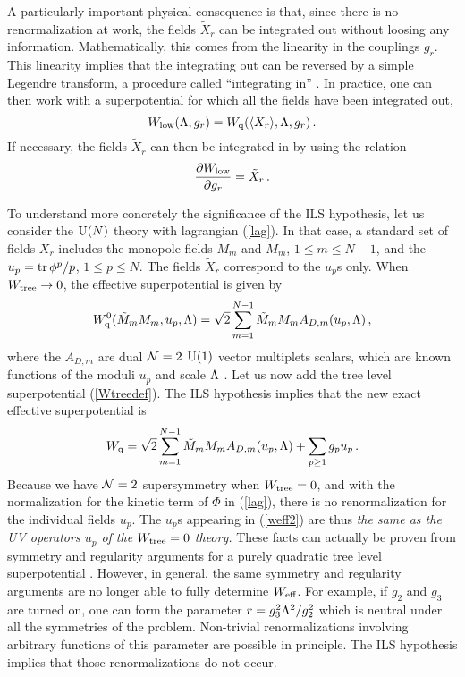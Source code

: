 \documentclass[a4paper,12pt]{article}
\def\tr{\mathop{\rm tr}\nolimits}
\def\uN{{\rm U}(N)}
\def\wl{W_{\rm low}}\def\wu{W_{\rm up}}\def\wq{W_{\rm q}}
\def\wt{W_{\rm tree}}\def\weff{W_{\rm eff}}\def\ww{{\cal W}}
\begin{document}
A particularly important physical consequence is that, since there is
no renormalization at work, the fields $\tilde X_{r}$ can be
integrated out without loosing any information. Mathematically, this
comes from the linearity in the couplings $g_{r}$. This linearity
implies that the integrating out can be reversed by a simple
Legendre transform, a procedure called ``integrating in'' \cite{ken}.
In practice, one can then work with a superpotential for which all the
fields have been integrated out,
%
\begin{equation}
\label{wlowdef}
\wl (\L,g_{r}) = \wq (\langle X_{r}\rangle, \L,g_{r})\, .
\end{equation}
%
If necessary, the fields $\tilde X_{r}$ can then be integrated in by 
using the relation
%
\begin{equation}
\label{intin}
{\partial\wl\over\partial g_{r}} = \tilde X_{r}\, .
\end{equation}
%

To understand more concretely the significance of the ILS hypothesis,
let us consider the $\uN$ theory with lagrangian
(\ref{lag}). In that case, a standard set of fields
$X_{r}$ includes the monopole fields
$M_{m}$ and $\tilde M_{m}$, $1\leq m\leq N-1$, and the
$u_{p}=\tr\phi^{p}/p$, $1\leq p\leq N$. The fields $\tilde X_{r}$
correspond to the $u_{p}$s only. When $\wt\rightarrow 0$, the effective
superpotential is given by \cite{SW1}
%
\begin{equation}
\label{w01}
\wq^{0}(\tilde M_{m} M_{m},u_{p},\L) = \sqrt{2}\sum_{m=1}^{N-1}
\tilde M_{m} M_{m} A_{D,m}(u_{p},\L)\, ,
\end{equation}
%
where the $A_{D,m}$ are 
dual ${\cal N}=2$ ${\rm U}(1)$ 
vector multiplets scalars, which are known functions of the moduli
$u_{p}$ and scale $\Lambda$ \cite{SW1,SW2}. 
Let us now add the tree level superpotential 
(\ref{Wtreedef}). The ILS hypothesis implies that the new exact 
effective superpotential is
%
\begin{equation}
\label{weff2}
\wq = \sqrt{2}\sum_{m=1}^{N-1}
\tilde M_{m} M_{m} A_{D,m}(u_{p},\L) + \sum_{p\geq 1} g_{p}u_{p}\, .
\end{equation}
%
Because we have ${\cal N}=2$ supersymmetry when $\wt =0$, and with the
normalization for the kinetic term of $\Phi$ in (\ref{lag}), there is
no renormalization for the individual fields $u_{p}$. The $u_{p}$s
appearing in (\ref{weff2}) are thus {\it the same as the UV operators
$u_{p}$ of the $\wt =0$ theory.} These facts can actually be proven
from symmetry and regularity arguments for a purely quadratic tree
level superpotential \cite{SW1}. However, in general, the same
symmetry and regularity arguments are no longer able to fully
determine $\weff$. For example, if $g_{2}$ and $g_{3}$ are turned on,
one can form the parameter $r=g_{3}^{2}\Lambda^{2}/g_{2}^{2}$ which is
neutral under all the symmetries of the problem. Non-trivial
renormalizations involving arbitrary functions of this parameter are
possible in principle. The ILS hypothesis implies that those
renormalizations do not occur.
\end{document}
